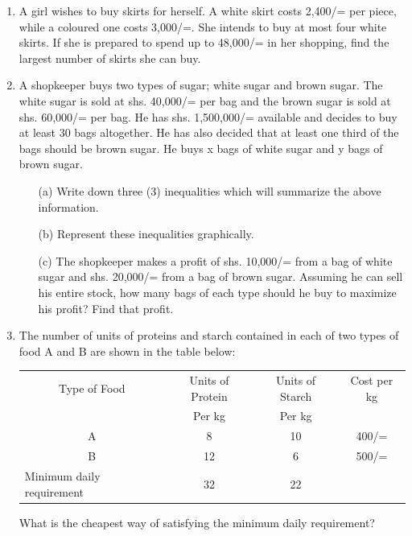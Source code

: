 \begin{enumerate}
	\item A girl wishes to buy skirts for herself. A white skirt costs 2,400/= per piece, while a coloured one costs 3,000/=. She intends to buy at most four white skirts. If she is prepared to spend up to 48,000/= in her shopping, find the largest number of skirts she can buy.
	
	\item A shopkeeper buys two types of sugar; white sugar and brown sugar. The white sugar is sold at shs. 40,000/= per bag and the brown sugar is sold at shs. 60,000/= per bag. He has shs. 1,500,000/= available and decides to buy at least 30 bags altogether. He has also decided that at least one third of the bags should be brown sugar. He buys x bags of white sugar and y bags of brown sugar.
	\begin{itemize}
	\item[(a)] Write down three (3) inequalities which will summarize the above information.
	\item[(b)] Represent these inequalities graphically.
	\item[(c)] The shopkeeper makes a profit of shs. 10,000/= from a bag of white sugar and shs. 20,000/= from a bag of brown sugar. Assuming he can sell his entire stock, how many bags of each type should he buy to maximize his profit? Find that profit.
	\end{itemize}
	
	\item The number of units of proteins and starch contained in each of two types of food A and B are shown in the table below:
	\begin{center}
	\begin{tabular}{|m{3cm}|c|c|c|} \hline
	\multicolumn{1}{|c|}{Type of Food} & Units of Protein & Units of Starch & Cost per kg\\ 
	& Per kg & Per kg & \\ \hline
	\multicolumn{1}{|c|}{A} & 8 & 10 & 400/= \\ \hline
	\multicolumn{1}{|c|}{B} & 12 & 6 & 500/= \\ \hline
	Minimum daily requirement & 32 & 22 & \\ \hline
	\end{tabular}
	\end{center}
	\noindent What is the cheapest way of satisfying the minimum daily requirement?
	

\end{enumerate}
